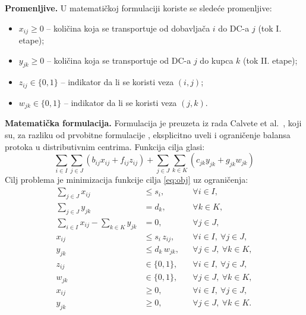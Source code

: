 \documentclass[12pt,a4paper]{article}
\begin{document}
\textbf{Promenljive.}
U matematičkoj formulaciji koriste se sledeće promenljive:
\begin{itemize}
  \item $x_{ij} \ge 0$ -- količina koja se transportuje od dobavljača $i$ do
    DC-a $j$ (tok I. etape);
  \item $y_{jk} \ge 0$ -- količina koja se transportuje od DC-a $j$ do kupca
    $k$ (tok II. etape);
  \item $z_{ij} \in \{0,1\}$ -- indikator da li se koristi veza $(i,j)$;
  \item $w_{jk} \in \{0,1\}$ -- indikator da li se koristi veza $(j,k)$.
\end{itemize}

\textbf{Matematička formulacija.}
Formulacija je preuzeta iz rada Calvete et al.\ \cite{calvete2018},
koji su, za razliku od prvobitne formulacije \cite{jb2009}, eksplicitno uveli i
ograničenje balansa protoka u distributivnim centrima. Funkcija cilja glasi:
\begin{equation} \label{eq:obj}
\sum_{i \in I}\sum_{j \in J} \left( b_{ij}x_{ij} + f_{ij}z_{ij} \right)
+ \sum_{j \in J}\sum_{k \in K} \left( c_{jk}y_{jk} + g_{jk}w_{jk} \right)
\end{equation}
Cilj problema je minimizacija funkcije cilja \eqref{eq:obj} uz ograničenja:
\begin{align}
\sum_{j \in J} x_{ij} &\le s_i, && \forall i \in I, \label{eq:sup}\\
\sum_{j \in J} y_{jk} &= d_k, && \forall k \in K, \label{eq:dem}\\
\sum_{i \in I} x_{ij} - \sum_{k \in K} y_{jk} &= 0, && \forall j \in J, \label{eq:bal}\\
x_{ij} &\le s_i\, z_{ij}, && \forall i \in I,\ \forall j \in J, \label{eq:bm1}\\
y_{jk} &\le d_k\, w_{jk}, && \forall j \in J,\ \forall k \in K, \label{eq:bm2}\\
z_{ij} &\in \{0,1\}, && \forall i \in I,\ \forall j \in J, \label{eq:domz}\\
w_{jk} &\in \{0,1\}, && \forall j \in J,\ \forall k \in K, \label{eq:domw}\\
x_{ij} &\ge 0, && \forall i \in I,\ \forall j \in J, \label{eq:domx}\\
y_{jk} &\ge 0, && \forall j \in J,\ \forall k \in K. \label{eq:domy}
\end{align}
\end{document}
